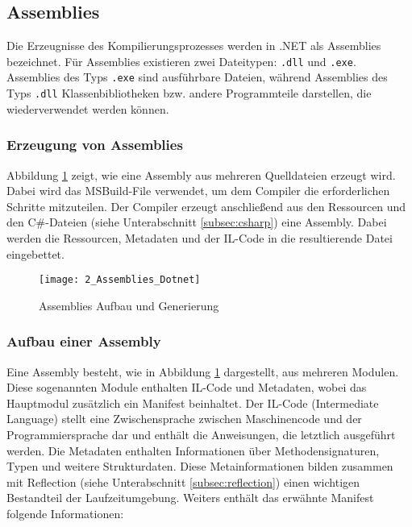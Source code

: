 \subsection{Assemblies}
\label{subsec:assemblies}
Die Erzeugnisse des Kompilierungsprozesses werden in .NET als Assemblies \cite{msdn_assembly_manifest} bezeichnet. Für Assemblies existieren zwei Dateitypen: \texttt{.dll} und \texttt{.exe}. Assemblies des Typs \texttt{.exe} sind ausführbare Dateien, während Assemblies des Typs \texttt{.dll} Klassenbibliotheken bzw. andere Programmteile darstellen, die wiederverwendet werden können.

\subsubsection{Erzeugung von Assemblies}
Abbildung \ref{fig:assemblies_dotnet} zeigt, wie eine Assembly aus mehreren Quelldateien erzeugt wird. Dabei wird das MSBuild-File verwendet, um dem Compiler die erforderlichen Schritte mitzuteilen. Der Compiler erzeugt anschließend aus den Ressourcen und den C\#-Dateien (siehe Unterabschnitt \ref{subsec:csharp}) eine Assembly. Dabei werden die Ressourcen, Metadaten und der IL-Code in die resultierende Datei eingebettet.

\begin{figure}[H]
    \centering
    \texttt{[image: 2\_Assemblies\_Dotnet]}
    \caption{Assemblies Aufbau und Generierung}
    \label{fig:assemblies_dotnet}
\end{figure}

\subsubsection{Aufbau einer Assembly}
Eine Assembly besteht, wie in Abbildung \ref{fig:assemblies_dotnet} dargestellt, aus mehreren Modulen. Diese sogenannten Module enthalten IL-Code und Metadaten, wobei das Hauptmodul zusätzlich ein Manifest beinhaltet.  
Der IL-Code (Intermediate Language) stellt eine Zwischensprache zwischen Maschinencode und der Programmiersprache dar und enthält die Anweisungen, die letztlich ausgeführt werden.  
Die Metadaten enthalten Informationen über Methodensignaturen, Typen und weitere Strukturdaten. Diese Metainformationen bilden zusammen mit Reflection (siehe Unterabschnitt \ref{subsec:reflection}) einen wichtigen Bestandteil der Laufzeitumgebung. Weiters enthält das erwähnte Manifest folgende Informationen:

